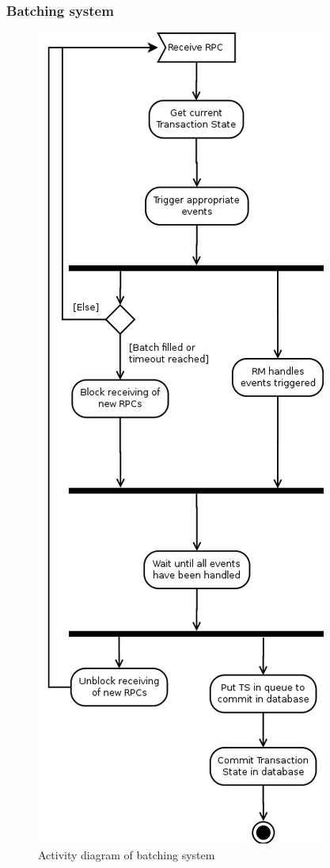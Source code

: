 \documentclass{beamer}
\begin{document}
\appendix
\begin{frame}
\frametitle{Batching system}

\begin{figure}
\centering
\includegraphics[scale=0.17]{resources/rpc_batch_system_activity.png}
\caption{Activity diagram of batching system}
\end{figure}
\end{frame}
\end{document}
